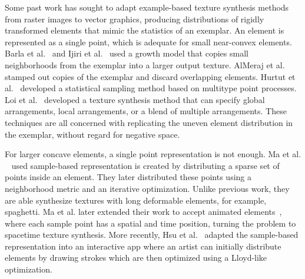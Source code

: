 \newtext
{
Some past work has sought to adapt example-based texture synthesis methods
from raster images to vector graphics, producing distributions of
rigidly transformed elements that mimic the statistics of an exemplar.
An element is represented as a single point, which is adequate for small near-convex elements.
Barla et al.~\cite{Barla2006} and Ijiri et al.~\cite{Ijiri2008} used a growth model that copies small neighborhoods
from the exemplar into a larger output texture.  AlMeraj et al.~\cite{AlMeraj2013}
stamped out copies of the exemplar and discard overlapping elements.
Hurtut et al.~\cite{Hurtut2009} developed a statistical sampling method based
on multitype point processes.  
Loi et al.~\cite{Loi2017} developed a texture synthesis method that
can specify global arrangements, local arrangements, or a blend of multiple arrangements.
These techniques are all concerned with replicating
the uneven element distribution in the exemplar, without regard for negative space.
}

\newtext
{
For larger concave elements, a single point representation is not enough.
Ma et al. ~\cite{Ma2011} used sample-based representation 
is created by distributing a sparse set of points inside an element.
They later distributed these points using a neighborhood metric and an iterative optimization.
Unlike previous work, they are able synthesize textures with long deformable elements, for example, spaghetti.
Ma et al. later extended their work to accept animated elements~\cite{Ma2013}, where
each sample point has a spatial and time position, turning the problem to spacetime texture synthesis.
More recently, Hsu et al.~\cite{Hsu2020} adapted the sample-based representation into an interactive app
where an artist can initially distribute elements by drawing strokes
which are then optimized using a Lloyd-like optimization.
}




